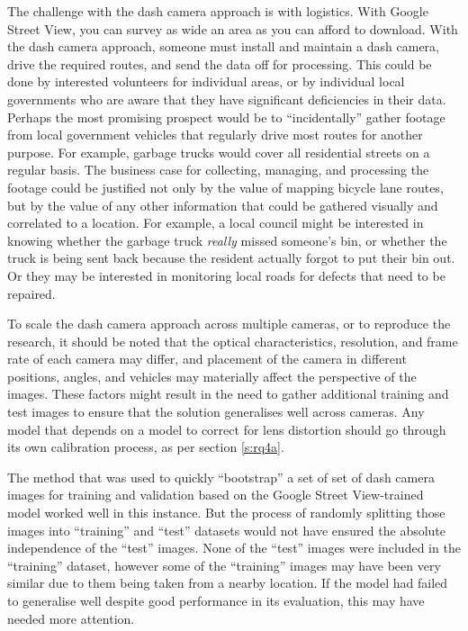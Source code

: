 \documentclass[11pt,twoside]{report}
\begin{document}
The challenge with the dash camera approach is with logistics.  With Google Street View, you can survey as wide an area as you can afford to download.  With the dash camera approach, someone must install and maintain a dash camera, drive the required routes, and send the data off for processing.  This could be done by interested volunteers for individual areas, or by individual local governments who are aware that they have significant deficiencies in their data.  Perhaps the most promising prospect would be to ``incidentally'' gather footage from local government vehicles that regularly drive most routes for another purpose.  For example, garbage trucks would cover all residential streets on a regular basis.  The business case for collecting, managing, and processing the footage could be justified not only by the value of mapping bicycle lane routes, but by the value of any other information that could be gathered visually and correlated to a location.  For example, a local council might be interested in knowing whether the garbage truck \textit{really} missed someone's bin, or whether the truck is being sent back because the resident actually forgot to put their bin out.  Or they may be interested in monitoring local roads for defects that need to be repaired.

To scale the dash camera approach across multiple cameras, or to reproduce the research, it should be noted that the optical characteristics, resolution, and frame rate of each camera may differ, and placement of the camera in different positions, angles, and vehicles may materially affect the perspective of the images.  These factors might result in the need to gather additional training and test images to ensure that the solution generalises well across cameras.  Any model that depends on a model to correct for lens distortion should go through its own calibration process, as per section \ref{s:rq4a}.

The method that was used to quickly ``bootstrap'' a set of set of dash camera images for training and validation based on the Google Street View-trained model worked well in this instance.  But the process of randomly splitting those images into ``training'' and ``test'' datasets would not have ensured the absolute independence of the ``test'' images.  None of the ``test'' images were included in the ``training'' dataset, however some of the ``training'' images may have been very similar due to them being taken from a nearby location.  If the model had failed to generalise well despite good performance in its evaluation, this may have needed more attention.
\end{document}
